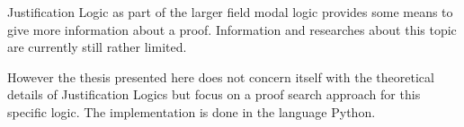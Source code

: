 
Justification Logic as part of the larger field modal logic provides some means to give more information about a proof. Information and researches about this topic are currently still rather limited. 

However the thesis presented here does not concern itself with the theoretical details of Justification Logics but focus on a proof search approach for this specific logic.  The implementation is done in the language Python.
